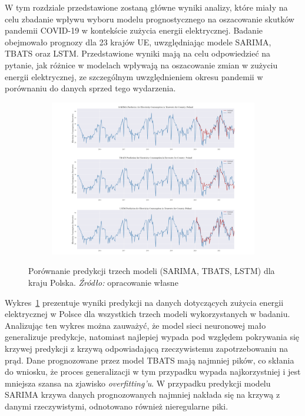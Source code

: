 \documentclass[polish, twoside, 12pt, a4paper]{article}
\theoremstyle{definition}
\theoremstyle{plain}
\theoremstyle{remark}
\begin{document}
W tym rozdziale przedstawione zostaną główne wyniki analizy, które miały na celu zbadanie wpływu wyboru modelu prognostycznego na oszacowanie skutków pandemii COVID-19 w kontekście zużycia energii elektrycznej. Badanie obejmowało prognozy dla 23 krajów UE, uwzględniając modele SARIMA, TBATS oraz LSTM. Przedstawione wyniki mają na celu odpowiedzieć na pytanie, jak różnice w modelach wpływają na oszacowanie zmian w zużyciu energii elektrycznej, ze szczególnym uwzględnieniem okresu pandemii w porównaniu do danych sprzed tego wydarzenia. 

\begin{figure}[hbt]
  \centering

  \begin{subfigure}[t]{0.95\textwidth}
    \includegraphics[width=\textwidth]{./out_figures/model_comparison_Poland.png}
  \end{subfigure}

  \captionsetup{margin=10pt,font=small,labelfont=bf,width=.8\textwidth}

  \caption[Porównanie predykcji trzech modeli (SARIMA, TBATS, LSTM) dla kraju Polska.]{Porównanie predykcji trzech modeli (SARIMA, TBATS, LSTM) dla kraju Polska. \textit{Źródło:} opracowanie własne}\label{fig:x13}
\end{figure}

Wykres~\ref{fig:x13} prezentuje wyniki predykcji na danych dotyczących zużycia energii elektrycznej w Polsce dla wszystkich trzech modeli wykorzystanych w badaniu. Analizując ten wykres można zauważyć, że model sieci neuronowej mało generalizuje predykcje, natomiast najlepiej wypada pod względem pokrywania się krzywej predykcji z krzywą odpowiadającą rzeczywistemu zapotrzebowaniu na prąd. Dane prognozowane przez model TBATS mają najmniej pików, co skłania do wniosku, że proces generalizacji w tym przypadku wypada najkorzystniej i jest mniejsza szansa na zjawisko \textit{overfitting'u}. W przypadku predykcji modelu SARIMA krzywa danych prognozowanych najmniej nakłada się na krzywą z danymi rzeczywistymi, odnotowano również nieregularne piki.
\end{document}
